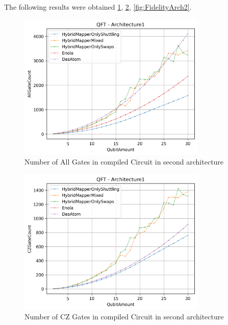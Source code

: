 The following results were obtained \ref{fig:AllGateCountArch2},
\ref{fig:CZGateCountArch2}, \ref{fig:FidelityArch2}.
\begin{figure}[htbp]
  \centering
    \includegraphics[width=0.8\textwidth]{figures/AllGateCountArch2.png}
    \caption[All Gate Number of second Architecture]{Number of All Gates in compiled Circuit in second architecture}
    \label{fig:AllGateCountArch2}
\end{figure}
\begin{figure}[htbp]
  \centering
    \includegraphics[width=0.8\textwidth]{figures/CZGateCountArch2.png}
    \caption[CZ Gate Number for first Architecture]{Number of CZ Gates in compiled Circuit in second architecture}
    \label{fig:CZGateCountArch2}
\end{figure}
